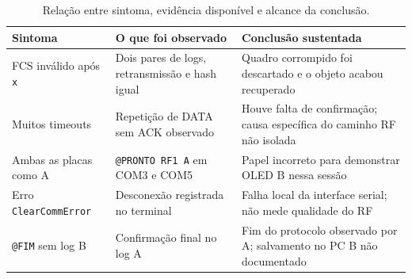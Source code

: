 \documentclass[12pt,a4paper]{article}
\begin{document}
\begin{table}[h]
\centering
\caption{Relação entre sintoma, evidência disponível e alcance da conclusão.}
\begin{tabular}{p{3cm}p{4.2cm}p{5.2cm}}
\toprule
Sintoma & O que foi observado & Conclusão sustentada \\
\midrule
FCS inválido após \texttt{x} & Dois pares de logs, retransmissão e hash igual & Quadro corrompido foi descartado e o objeto acabou recuperado \\
Muitos timeouts & Repetição de DATA sem ACK observado & Houve falta de confirmação; causa específica do caminho RF não isolada \\
Ambas as placas como A & \texttt{@PRONTO RF1 A} em COM3 e COM5 & Papel incorreto para demonstrar OLED B nessa sessão \\
Erro \texttt{ClearCommError} & Desconexão registrada no terminal & Falha local da interface serial; não mede qualidade do RF \\
\texttt{@FIM} sem log B & Confirmação final no log A & Fim do protocolo observado por A; salvamento no PC B não documentado \\
\bottomrule
\end{tabular}
\end{table}
\end{document}
